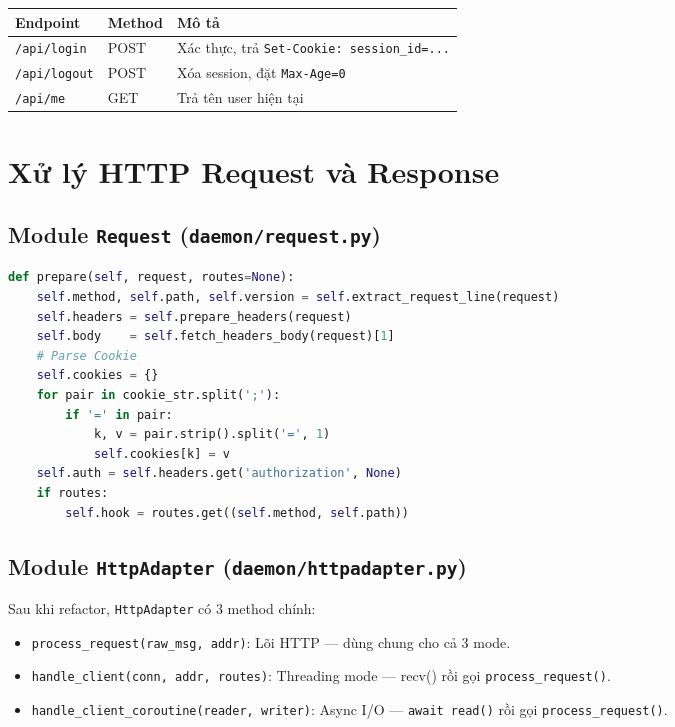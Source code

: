 \documentclass[12pt,a4paper]{article}
\begin{document}
\begin{longtable}{|p{4cm}|p{2cm}|p{9cm}|}
\hline
\textbf{Endpoint} & \textbf{Method} & \textbf{Mô tả} \\ \hline
\texttt{/api/login} & POST & Xác thực, trả \texttt{Set-Cookie: session\_id=...} \\ \hline
\texttt{/api/logout} & POST & Xóa session, đặt \texttt{Max-Age=0} \\ \hline
\texttt{/api/me} & GET & Trả tên user hiện tại \\ \hline
\end{longtable}

\section{Xử lý HTTP Request và Response}

\subsection{Module \texttt{Request} (\texttt{daemon/request.py})}

\begin{lstlisting}[language=Python]
def prepare(self, request, routes=None):
    self.method, self.path, self.version = self.extract_request_line(request)
    self.headers = self.prepare_headers(request)
    self.body    = self.fetch_headers_body(request)[1]
    # Parse Cookie
    self.cookies = {}
    for pair in cookie_str.split(';'):
        if '=' in pair:
            k, v = pair.strip().split('=', 1)
            self.cookies[k] = v
    self.auth = self.headers.get('authorization', None)
    if routes:
        self.hook = routes.get((self.method, self.path))
\end{lstlisting}

\subsection{Module \texttt{HttpAdapter} (\texttt{daemon/httpadapter.py})}

Sau khi refactor, \texttt{HttpAdapter} có 3 method chính:
\begin{itemize}
  \item \texttt{process\_request(raw\_msg, addr)}: Lõi HTTP --- dùng chung cho cả 3 mode.
  \item \texttt{handle\_client(conn, addr, routes)}: Threading mode --- recv() rồi gọi \texttt{process\_request()}.
  \item \texttt{handle\_client\_coroutine(reader, writer)}: Async I/O --- \texttt{await read()} rồi gọi \texttt{process\_request()}.
\end{itemize}
\end{document}

